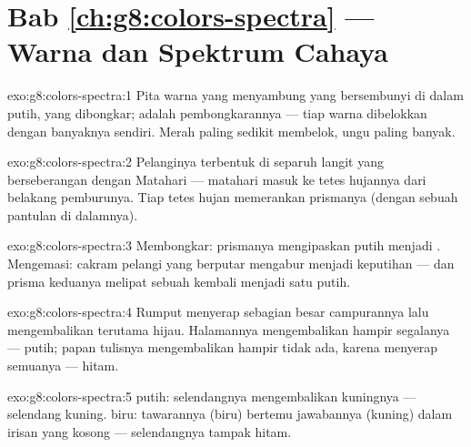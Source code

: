 \section*{Bab \ref{ch:g8:colors-spectra} --- Warna dan Spektrum Cahaya}

\begin{solution}{exo:g8:colors-spectra:1}
Pita warna yang menyambung yang bersembunyi di dalam  putih,
yang dibongkar;  adalah pembongkarannya --- tiap warna
dibelokkan dengan banyaknya sendiri. Merah paling sedikit membelok,
ungu paling banyak.
\end{solution}

\begin{solution}{exo:g8:colors-spectra:2}
Pelanginya terbentuk di separuh langit yang berseberangan dengan
Matahari ---  matahari masuk ke tetes hujannya dari belakang
pemburunya. Tiap tetes hujan memerankan prismanya (dengan sebuah
pantulan  di dalamnya).
\end{solution}

\begin{solution}{exo:g8:colors-spectra:3}
Membongkar: prismanya mengipaskan  putih menjadi .
Mengemasi: cakram pelangi yang berputar mengabur menjadi keputihan ---
dan prisma keduanya melipat sebuah  kembali menjadi satu
 putih.
\end{solution}

\begin{solution}{exo:g8:colors-spectra:4}
Rumput menyerap sebagian besar campurannya lalu mengembalikan terutama
hijau. Halamannya mengembalikan hampir segalanya --- putih; papan
tulisnya mengembalikan hampir tidak ada, karena menyerap semuanya ---
hitam.
\end{solution}

\begin{solution}{exo:g8:colors-spectra:5}
 putih: selendangnya mengembalikan kuningnya --- selendang
kuning.  biru: tawarannya (biru) bertemu jawabannya (kuning)
dalam irisan yang kosong --- selendangnya tampak hitam.
\end{solution}


